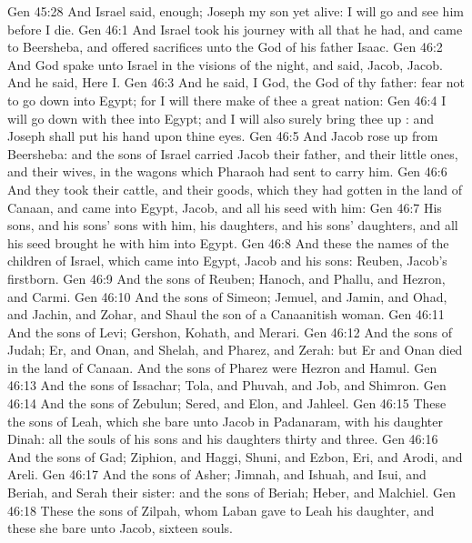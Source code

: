 \vs Gen 45:28 And Israel said,  enough; Joseph my son  yet alive: I will go and see him before I die.
\vs Gen 46:1 And Israel took his journey with all that he had, and came to Beersheba, and offered sacrifices unto the God of his father Isaac.
\vs Gen 46:2 And God spake unto Israel in the visions of the night, and said, Jacob, Jacob. And he said, Here  I.
\vs Gen 46:3 And he said, I  God, the God of thy father: fear not to go down into Egypt; for I will there make of thee a great nation:
\vs Gen 46:4 I will go down with thee into Egypt; and I will also surely bring thee up : and Joseph shall put his hand upon thine eyes.
\vs Gen 46:5 And Jacob rose up from Beersheba: and the sons of Israel carried Jacob their father, and their little ones, and their wives, in the wagons which Pharaoh had sent to carry him.
\vs Gen 46:6 And they took their cattle, and their goods, which they had gotten in the land of Canaan, and came into Egypt, Jacob, and all his seed with him:
\vs Gen 46:7 His sons, and his sons' sons with him, his daughters, and his sons' daughters, and all his seed brought he with him into Egypt.
\vs Gen 46:8 And these  the names of the children of Israel, which came into Egypt, Jacob and his sons: Reuben, Jacob's firstborn.
\vs Gen 46:9 And the sons of Reuben; Hanoch, and Phallu, and Hezron, and Carmi.
\vs Gen 46:10 And the sons of Simeon; Jemuel, and Jamin, and Ohad, and Jachin, and Zohar, and Shaul the son of a Canaanitish woman.
\vs Gen 46:11 And the sons of Levi; Gershon, Kohath, and Merari.
\vs Gen 46:12 And the sons of Judah; Er, and Onan, and Shelah, and Pharez, and Zerah: but Er and Onan died in the land of Canaan. And the sons of Pharez were Hezron and Hamul.
\vs Gen 46:13 And the sons of Issachar; Tola, and Phuvah, and Job, and Shimron.
\vs Gen 46:14 And the sons of Zebulun; Sered, and Elon, and Jahleel.
\vs Gen 46:15 These  the sons of Leah, which she bare unto Jacob in Padanaram, with his daughter Dinah: all the souls of his sons and his daughters  thirty and three.
\vs Gen 46:16 And the sons of Gad; Ziphion, and Haggi, Shuni, and Ezbon, Eri, and Arodi, and Areli.
\vs Gen 46:17 And the sons of Asher; Jimnah, and Ishuah, and Isui, and Beriah, and Serah their sister: and the sons of Beriah; Heber, and Malchiel.
\vs Gen 46:18 These  the sons of Zilpah, whom Laban gave to Leah his daughter, and these she bare unto Jacob,  sixteen souls.
